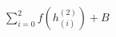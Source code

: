 \documentclass[]{standalone}
\begin{document}
$\sum_{i=0}^{2}f\left( h_{(i)}^{(2)} \right) + B$
\end{document}
